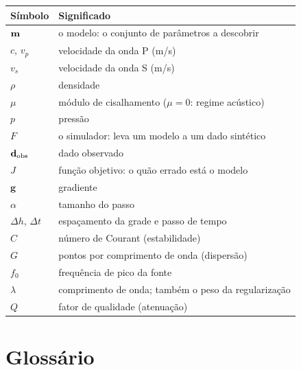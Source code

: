 \documentclass[11pt,a4paper,oneside]{report}
\begin{document}
\begin{center}
\begin{longtable}{@{}ll@{}}
\toprule
\textbf{S\'imbolo} & \textbf{Significado} \\
\midrule
\endhead
$\mathbf{m}$ & o modelo: o conjunto de par\^ametros a descobrir \\
$c$, $v_p$ & velocidade da onda P (m/s) \\
$v_s$ & velocidade da onda S (m/s) \\
$\rho$ & densidade \\
$\mu$ & m\'odulo de cisalhamento ($\mu = 0$: regime ac\'ustico) \\
$p$ & press\~ao \\
$F$ & o simulador: leva um modelo a um dado sint\'etico \\
$\mathbf{d}_{\mathrm{obs}}$ & dado observado \\
$J$ & fun\c{c}\~ao objetivo: o qu\~ao errado est\'a o modelo \\
$\mathbf{g}$ & gradiente \\
$\alpha$ & tamanho do passo \\
$\Delta h$, $\Delta t$ & espa\c{c}amento da grade e passo de tempo \\
$C$ & n\'umero de Courant (estabilidade) \\
$G$ & pontos por comprimento de onda (dispers\~ao) \\
$f_0$ & frequ\^encia de pico da fonte \\
$\lambda$ & comprimento de onda; tamb\'em o peso da regulariza\c{c}\~ao \\
$Q$ & fator de qualidade (atenua\c{c}\~ao) \\
\bottomrule
\end{longtable}
\end{center}

\chapter{Gloss\'ario}
\end{document}
